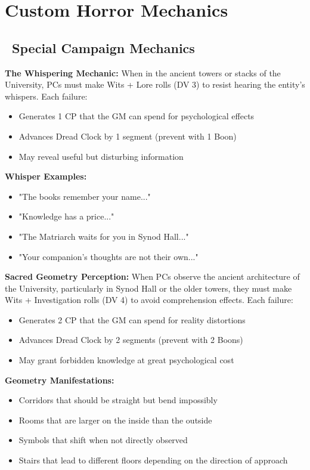 \documentclass[11pt]{article}
\begin{document}
\section{Custom Horror Mechanics}

\subsection*{\faSkull\ Special Campaign Mechanics}

\textbf{The Whispering Mechanic:}
When in the ancient towers or stacks of the University, PCs must make Wits + Lore rolls (DV 3) to resist hearing the entity's whispers. Each failure:
\begin{itemize}
    \item Generates 1 CP that the GM can spend for psychological effects
    \item Advances Dread Clock by 1 segment (prevent with 1 Boon)
    \item May reveal useful but disturbing information
\end{itemize}

\textbf{Whisper Examples:}
\begin{itemize}
    \item "The books remember your name..."
    \item "Knowledge has a price..."
    \item "The Matriarch waits for you in Synod Hall..."
    \item "Your companion's thoughts are not their own..."
\end{itemize}

\textbf{Sacred Geometry Perception:}
When PCs observe the ancient architecture of the University, particularly in Synod Hall or the older towers, they must make Wits + Investigation rolls (DV 4) to avoid comprehension effects. Each failure:
\begin{itemize}
    \item Generates 2 CP that the GM can spend for reality distortions
    \item Advances Dread Clock by 2 segments (prevent with 2 Boons)
    \item May grant forbidden knowledge at great psychological cost
\end{itemize}

\textbf{Geometry Manifestations:}
\begin{itemize}
    \item Corridors that should be straight but bend impossibly
    \item Rooms that are larger on the inside than the outside
    \item Symbols that shift when not directly observed
    \item Stairs that lead to different floors depending on the direction of approach
\end{itemize}
\end{document}

